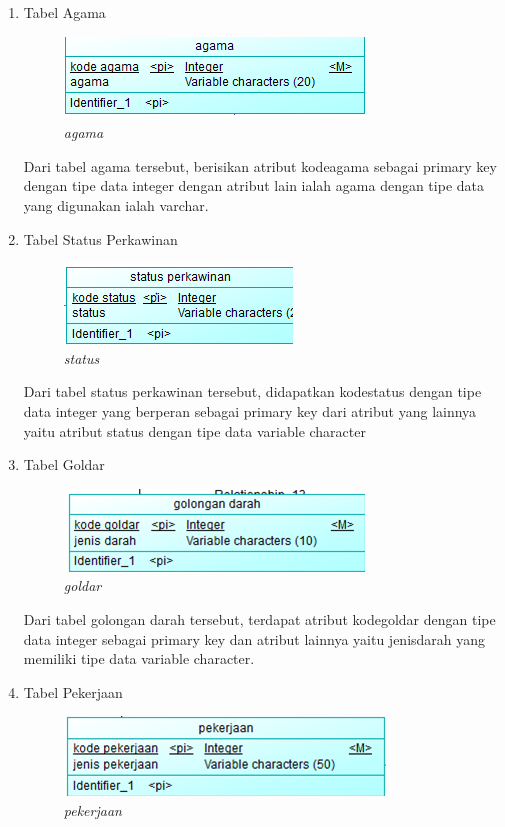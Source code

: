 \documentclass[12pt,a4paper,bahasa]{article}
\begin{document}
\begin{enumerate}
	\item Tabel Agama\\
	
\begin{figure}[!htbp]
\centering
\includegraphics[scale=1.5]{gambar/agama.png}
\caption{\textit{agama}}
\label{agama}
\end{figure}
	
	Dari tabel agama tersebut, berisikan atribut kodeagama sebagai primary key dengan tipe data integer dengan atribut lain ialah agama dengan tipe data yang digunakan  ialah varchar.
	
	\item Tabel Status Perkawinan\\
\begin{figure}[!htbp]
\centering
\includegraphics[scale=1.5]{gambar/status.png}
\caption{\textit{status}}
\label{status}
\end{figure}
	
	Dari tabel status perkawinan tersebut, didapatkan kodestatus dengan tipe data integer yang berperan sebagai primary key dari atribut yang lainnya yaitu atribut status dengan tipe data variable character
	
	\item Tabel Goldar\\
\begin{figure}[!htbp]
\centering
\includegraphics[scale=1.5]{gambar/goldar.png}
\caption{\textit{goldar}}
\label{goldar}
\end{figure}
	
	Dari tabel golongan darah tersebut, terdapat atribut kodegoldar dengan tipe data integer sebagai primary key dan atribut lainnya yaitu jenisdarah yang memiliki tipe data variable character.
	\item Tabel Pekerjaan\\
\begin{figure}[!htbp]
\centering
\includegraphics[scale=1.5]{gambar/pekerjaan.png}
\caption{\textit{pekerjaan}}
\label{perkerjaan}
\end{figure}



\end{enumerate}
\end{document}
